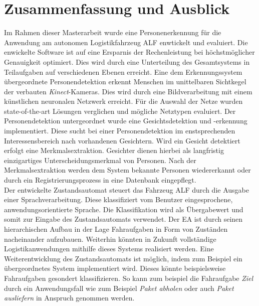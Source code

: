 \chapter{Zusammenfassung und Ausblick}
\label{Fazit und Ausblick}
	
Im Rahmen dieser Masterarbeit wurde eine Personenerkennung für die Anwendung am autonomen Logistikfahrzeug ALF enwtickelt und evaluiert. Die enwickelte Software ist auf eine Ersparnis der Rechenleistung bei höchstmöglicher Genauigkeit optimiert. Dies wird durch eine Unterteilung des Gesamtsystems in Teilaufgaben auf verschiedenen Ebenen erreicht. Eine dem Erkennungssystem übergeordnete Personendetektion erkennt Menschen im unittelbaren Sichtkegel der verbauten \textit{Kinect}-Kameras. Dies wird durch eine Bildverarbeitung mit einem künstlichen neuronalen Netzwerk erreicht. Für die Auswahl der Netze wurden state-of-the-art Lösungen verglichen und mögliche Netztypen evaluiert.
Der Personendetektion untergeordnet wurde eine Gesichtsdetektion und -erkennung implementiert. Diese sucht bei einer Personendetektion im enstsprechenden Interessensbereich nach vorhandenen Gesichtern. Wird ein Gesicht detektiert erfolgt eine Merkmalsextraktion. Gesichter dienen hierbei als langfristig einzigartiges Unterscheidungsmerkmal von Personen. Nach der Merkmalsextraktion werden dem System bekannte Personen wiedererkannt oder durch ein Registrierungsprozess in eine Datenbank eingepflegt.\\

Der entwickelte Zustandsautomat steuert das Fahrzeug ALF durch die Ausgabe einer Sprachverarbeitung. Diese klassifiziert vom Benutzer eingesprochene, anwendungsorientierte Sprache. Die Klassifikation wird als Übergabewert und somit zur Eingabe des Zustandsautomats verwendet. Der EA ist durch seinen hierarchischen Aufbau in der Lage Fahraufgaben in Form von Zuständen nacheinander aufzubauen. Weiterhin könnten in Zukunft vollständige Logistikanwendungen mithilfe dieses Systems realisiert werden. Eine Weiterentwicklung des Zustandsautomats ist möglich, indem zum Beispiel ein übergeordnetes System implementiert wird. Dieses könnte beispielsweise Fahraufgaben gesondert klassifizieren. So kann zum beispiel die Fahraufgabe \textit{Ziel} durch ein Anwendungsfall wie zum Beispiel \textit{Paket abholen} oder auch \textit{Paket ausliefern} in Anspruch genommen werden.\\


